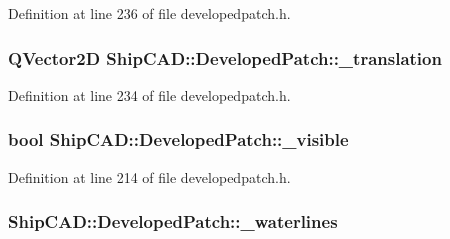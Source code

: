 Definition at line 236 of file developedpatch.\+h.

\subsubsection[{\texorpdfstring{\+\_\+translation}{_translation}}]{\setlength{\rightskip}{0pt plus 5cm}Q\+Vector2D Ship\+C\+A\+D\+::\+Developed\+Patch\+::\+\_\+translation\hspace{0.3cm}{\ttfamily [protected]}}\hypertarget{classShipCAD_1_1DevelopedPatch_a58a7a720496ce4fe60118e4e6e477fdd}{}\label{classShipCAD_1_1DevelopedPatch_a58a7a720496ce4fe60118e4e6e477fdd}


Definition at line 234 of file developedpatch.\+h.

\subsubsection[{\texorpdfstring{\+\_\+visible}{_visible}}]{\setlength{\rightskip}{0pt plus 5cm}bool Ship\+C\+A\+D\+::\+Developed\+Patch\+::\+\_\+visible\hspace{0.3cm}{\ttfamily [protected]}}\hypertarget{classShipCAD_1_1DevelopedPatch_ab4f30ac4039457e394a106294150a5eb}{}\label{classShipCAD_1_1DevelopedPatch_ab4f30ac4039457e394a106294150a5eb}


Definition at line 214 of file developedpatch.\+h.

\subsubsection[{\texorpdfstring{\+\_\+waterlines}{_waterlines}}]{ Ship\+C\+A\+D\+::\+Developed\+Patch\+::\+\_\+waterlines\hspace{0.3cm}{\ttfamily [protected]}}\hypertarget{classShipCAD_1_1DevelopedPatch_a4708ff9dd3e334c0e774944d25b07947}{}\label{classShipCAD_1_1DevelopedPatch_a4708ff9dd3e334c0e774944d25b07947}


